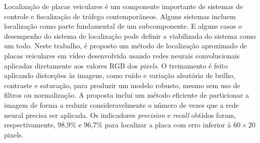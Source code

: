 
Localização de placas veiculares é um componente importante de sistemas de
controle e fiscalização de tráfego contemporâneos. Alguns sistemas incluem
localização como parte fundamental de um subcomponente. E alguns casos
o desempenho do sistema de localização pode definir a viabilizada do sistema
como um todo.
Neste trabalho, é proposto um método de localização aproximado de placas
veiculares
em vídeo desenvolvida usando redes neurais convolucionais aplicadas diretamente
aos valores RGB dos \emph{pixels}. O treinamento é feito aplicando distorções
às imagens, como
ruído e variação aleatória de brilho, contraste e saturação, para produzir um
modelo robusto, mesmo sem uso de filtros ou normalização. A proposta inclui um
método eficiente de particionar a imagem de forma a reduzir consideravelmente o
número de vezes que a rede neural precisa ser aplicada. Os indicadores
\emph{precision} e \emph{recall} obtidos foram, respectivamente, 98,9\% e
96,7\% para localizar a placa com erro inferior à $60 \times 20$ pixels.
